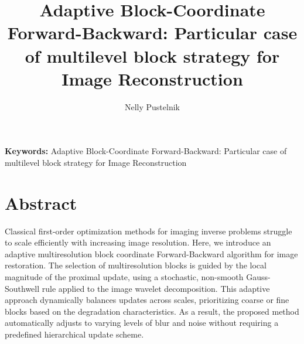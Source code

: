 \documentclass[11pt]{article}
\title{\bfseries Adaptive Block-Coordinate Forward-Backward: Particular case of multilevel block strategy for Image Reconstruction}
\author{Nelly Pustelnik}
\date{}
\begin{document}
\maketitle

\vspace{-1em}

\noindent
\textbf{Keywords:}
Adaptive Block-Coordinate Forward-Backward: Particular case of multilevel block strategy for Image Reconstruction

\vspace{0.5em}


\vspace{1em}

\section*{Abstract}
Classical first-order optimization methods for imaging inverse problems struggle to scale efficiently with increasing image resolution. Here, we introduce an adaptive multiresolution block coordinate Forward-Backward algorithm for image restoration. The selection of multiresolution blocks is guided by the local magnitude of the proximal update, using a stochastic, non-smooth Gauss-Southwell rule applied to the image wavelet decomposition. This adaptive approach dynamically balances updates across scales, prioritizing coarse or fine blocks based on the degradation characteristics. As a result, the proposed method automatically adjusts to varying levels of blur and noise without requiring a predefined hierarchical update scheme. 
\vspace{1em}

\noindent

\vspace{1em}



\end{document}
